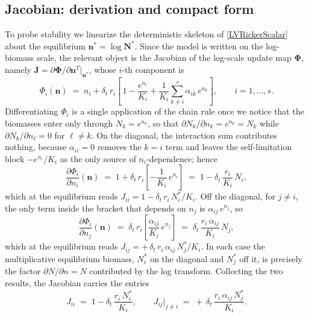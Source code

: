 \documentclass[12pt]{article}
\begin{document}
\subsection{Jacobian: derivation and compact form}

To probe stability we linearize the deterministic skeleton of \eqref{LVRickerScalar} about the equilibrium $\mathbf{n}^{*}=\log\mathbf{N}^{*}$. Since the model is written on the log-biomass scale, the relevant object is the Jacobian of the log-scale update map $\boldsymbol{\Phi}$, namely $\mathbf{J}=\partial\boldsymbol{\Phi}/\partial\mathbf{n}^{T}\bigl|_{\mathbf{n}^{*}}$, whose $i$-th component is
\begin{equation*}
	\Phi_{i}(\mathbf{n}) \;=\; n_{i} + \delta_{t}\,r_{i}\!\left[\,1 - \frac{e^{n_{i}}}{K_{i}} + \frac{1}{K_{i}}\sum_{k\neq i}^{s}\alpha_{ik}\,e^{n_{k}}\right],\qquad i=1,\ldots,s.
\end{equation*}
Differentiating $\Phi_{i}$ is a single application of the chain rule once we notice that the biomasses enter only through $N_{k}=e^{n_{k}}$, so that $\partial N_{k}/\partial n_{k}=e^{n_{k}}=N_{k}$ while $\partial N_{k}/\partial n_{\ell}=0$ for $\ell\neq k$. On the diagonal, the interaction sum contributes nothing, because $\alpha_{ii}=0$ removes the $k=i$ term and leaves the self-limitation block $-e^{n_{i}}/K_{i}$ as the only source of $n_{i}$-dependence; hence
\begin{equation*}
	\frac{\partial \Phi_{i}}{\partial n_{i}}(\mathbf{n}) \;=\; 1 + \delta_{t}\,r_{i}\!\left[-\frac{1}{K_{i}}\,e^{n_{i}}\right] \;=\; 1 - \delta_{t}\,\frac{r_{i}}{K_{i}}\,N_{i},
\end{equation*}
which at the equilibrium reads $J_{ii}=1-\delta_{t}\,r_{i}\,N_{i}^{*}/K_{i}$. Off the diagonal, for $j\neq i$, the only term inside the bracket that depends on $n_{j}$ is $\alpha_{ij}\,e^{n_{j}}$, so
\begin{equation*}
	\frac{\partial \Phi_{i}}{\partial n_{j}}(\mathbf{n}) \;=\; \delta_{t}\,r_{i}\!\left[\frac{\alpha_{ij}}{K_{i}}\,e^{n_{j}}\right] \;=\; \delta_{t}\,\frac{r_{i}\,\alpha_{ij}}{K_{i}}\,N_{j},
\end{equation*}
which at the equilibrium reads $J_{ij}=+\,\delta_{t}\,r_{i}\,\alpha_{ij}\,N_{j}^{*}/K_{i}$. In each case the multiplicative equilibrium biomass, $N_{i}^{*}$ on the diagonal and $N_{j}^{*}$ off it, is precisely the factor $\partial N/\partial n=N$ contributed by the log transform. Collecting the two results, the Jacobian carries the entries
\begin{equation*}
	J_{ii} \;=\; 1 - \delta_{t}\,\frac{r_{i}\,N_{i}^{*}}{K_{i}}, \qquad J_{ij}\bigl|_{j\neq i} \;=\; +\,\delta_{t}\,\frac{r_{i}\,\alpha_{ij}\,N_{j}^{*}}{K_{i}}.
\end{equation*}
\end{document}
